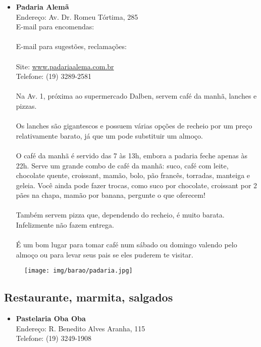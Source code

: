 \begin{itemize}
\item \textbf{Padaria Alemã}
  \\Endereço: Av. Dr. Romeu Tórtima, 285
  \\E-mail para encomendas:\\
  \\E-mail para sugestões, reclamações:\\
  \\Site: \url{www.padariaalema.com.br}
  \\Telefone: (19) 3289-2581
  \\
  \\Na Av. 1, próxima ao supermercado Dalben, servem café da manhã, lanches e
  pizzas.
  \\
  \\Os lanches são gigantescos e possuem várias opções de recheio por um preço
  relativamente barato, já que um pode substituir um almoço.
  \\
  \\O café da manhã é servido das 7 às 13h, embora a padaria feche apenas às
  22h. Serve um grande combo de café da manhã: suco, café com leite, chocolate
  quente, croissant, mamão, bolo, pão francês, torradas, manteiga e geleia.
  Você ainda pode fazer trocas, como suco por chocolate, croissant por 2 pães
  na chapa, mamão por banana, pergunte o que oferecem!
  \\
  \\Também servem pizza que, dependendo do recheio, é muito barata.
  Infelizmente não fazem entrega.
  \\
  \\É um bom lugar para tomar café num sábado ou domingo valendo pelo almoço ou
  para levar seus pais se eles puderem te visitar.
\end{itemize}

\begin{figure}[h!]
    \centering
    \texttt{[image: img/barao/padaria.jpg]}
\end{figure}

\subsection{Restaurante, marmita, salgados}

\begin{itemize}
\item \textbf{Pastelaria Oba Oba}
  \\Endereço: R. Benedito Alves Aranha, 115
  \\Telefone: (19) 3249-1908
\end{itemize}


